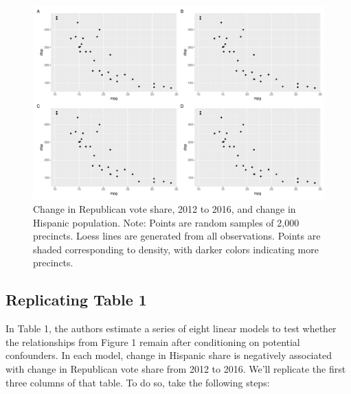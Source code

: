 \documentclass[12pt,halfline,a4paper,]{ouparticle}
\begin{document}
\begin{figure}[p]
\includegraphics[width=1\linewidth]{hill-hopkins-huber_files/figure-latex/arrange plots with patchwork-1} \caption{Change in Republican vote share, 2012 to 2016, and change in Hispanic population. Note: Points are random samples of 2,000 precincts. Loess lines are generated from all observations. Points are shaded corresponding to density, with darker colors indicating more precincts.}\label{fig:arrange plots with patchwork}
\end{figure}

\hypertarget{replicating-table-1}{%
\subsection{Replicating Table 1}\label{replicating-table-1}}

In Table 1, the authors estimate a series of eight linear models to test
whether the relationships from Figure 1 remain after conditioning on
potential confounders. In each model, change in Hispanic share is
negatively associated with change in Republican vote share from 2012 to
2016. We'll replicate the first three columns of that table. To do so,
take the following steps:
\end{document}
